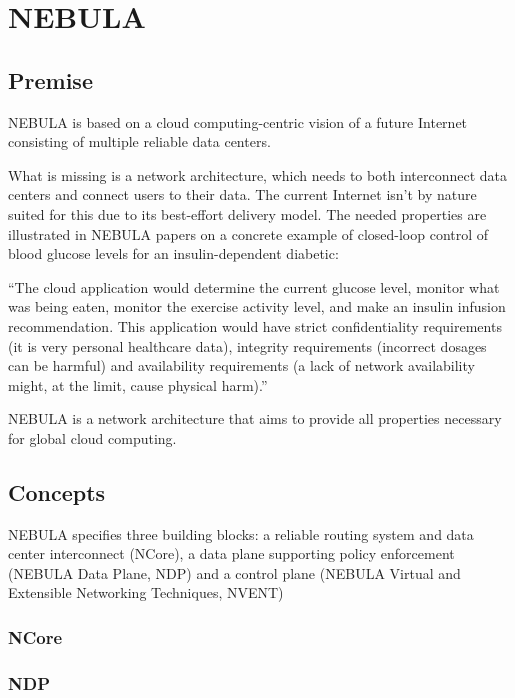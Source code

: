     \section{NEBULA}\label{archs:nebula}

        \subsection{Premise}

            NEBULA is based on a cloud computing-centric vision of a future Internet consisting of multiple reliable data centers.

            What is missing is a network architecture, which needs to both interconnect data centers and connect users to their data. The current Internet isn't by nature suited for this due to its best-effort delivery model. The needed properties are illustrated in NEBULA papers on a concrete example of closed-loop control of blood glucose levels for an insulin-dependent diabetic:

            ``The cloud application would determine the current glucose level, monitor what was being eaten, monitor the exercise activity level, and make an insulin infusion recommendation. This application would have strict confidentiality requirements (it is very personal healthcare data), integrity requirements (incorrect dosages can be harmful) and availability requirements (a lack of network availability might, at the limit, cause physical harm).''

            NEBULA is a network architecture that aims to provide all properties necessary for global cloud computing.

        \subsection{Concepts}

            NEBULA specifies three building blocks: a reliable routing system and data center interconnect (NCore), a data plane supporting policy enforcement (NEBULA Data Plane, NDP) and a control plane (NEBULA Virtual and Extensible Networking Techniques, NVENT)

            \subsubsection{NCore}

            \subsubsection{NDP}

